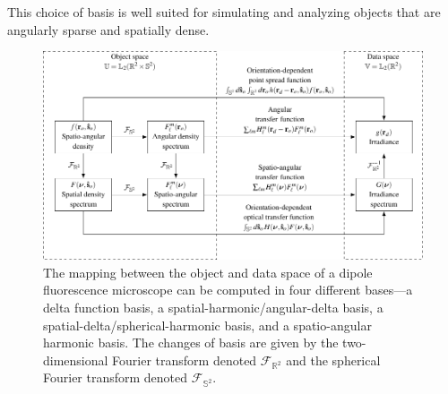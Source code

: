 \documentclass[]{osa-article}
\providecommand{\mbb}[1]{\mathbb{#1}}
\begin{document}
  This choice of basis is well suited for simulating and analyzing objects that
  are angularly sparse and spatially dense.

  \begin{figure}
  \hspace{-5em}
  \includegraphics[scale=1.0]{../figures/dipole-block/dipole-block.pdf}
  \caption{The mapping between the object and data space of a dipole
    fluorescence microscope can be computed in four different bases---a delta
    function basis, a spatial-harmonic/angular-delta basis, a
    spatial-delta/spherical-harmonic basis, and a spatio-angular harmonic basis.
    The changes of basis are given by the two-dimensional Fourier transform
    denoted $\mathcal{F}_{\mbb{R}^2}$ and the spherical Fourier transform
    denoted $\mathcal{F}_{\mbb{S}^2}$.}
   \label{fig:dipole-block}      
    \end{figure}
\end{document}
